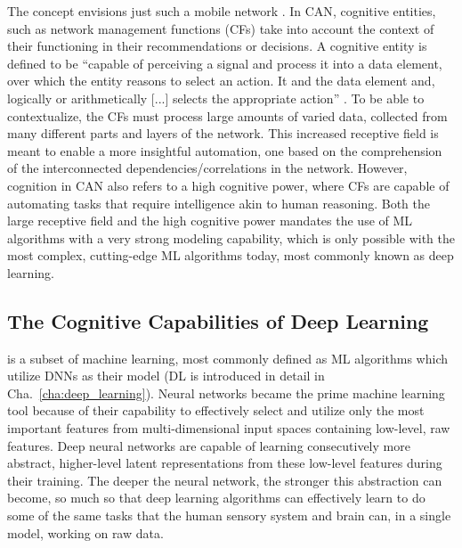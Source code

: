 			The  concept envisions just such a mobile network \cite{can_book}.
			In \ac{CAN}, cognitive entities, such as network management functions (\acp{CF}) take into account the context of their functioning in their recommendations or decisions.
			A cognitive entity is defined to be ``capable of perceiving a signal and process it into a data element, over which the entity reasons to select an action.
			It  and  the data element and, logically or arithmetically [...] selects the appropriate action'' \cite{can_book}.	
			To be able to contextualize, the \acp{CF} must process large amounts of varied data, collected from many different parts and layers of the network.
			This increased receptive field is meant to enable a more insightful automation, one based on the comprehension of the interconnected dependencies/correlations in the network.
			However, cognition in \ac{CAN} also refers to a high cognitive power, where \acp{CF} are capable of automating tasks that require intelligence akin to human reasoning.
			Both the large receptive field and the high cognitive power mandates the use of \ac{ML} algorithms with a very strong modeling capability, which is only possible with the most complex, cutting-edge \ac{ML} algorithms today, most commonly known as deep learning.
			
		\subsection{The Cognitive Capabilities of Deep Learning}
			\label{cha:intro:sec:cognitive_cap_dl}
			
			 is a subset of machine learning, most commonly defined as \ac{ML} algorithms which utilize \acp{DNN} as their model (\ac{DL} is introduced in detail in Cha.~\ref{cha:deep_learning}).	
			Neural networks became the prime machine learning tool because of their capability to effectively select and utilize only the most important features from multi-dimensional input spaces containing low-level, raw features.
			Deep neural networks are capable of learning consecutively more abstract, higher-level latent representations from these low-level features during their training.
			The deeper the neural network, the stronger this abstraction can become, so much so that deep learning algorithms can effectively learn to do some of the same tasks that the human sensory system and brain can, in a single model, working on raw data.
						
